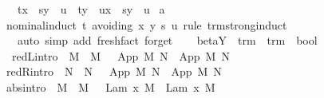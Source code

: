 \begin{isabellebody}
\ \ \ {\isachardoublequoteopen}t{\isacharbrackleft}x\ {\isacharcolon}{\isacharcolon}{\isacharequal}\ s{\isacharbrackright}{\isacharbrackleft}y\ {\isacharcolon}{\isacharcolon}{\isacharequal}\ u{\isacharbrackright}\ {\isacharequal}\ t{\isacharbrackleft}y\ {\isacharcolon}{\isacharcolon}{\isacharequal}\ u{\isacharbrackright}{\isacharbrackleft}x\ {\isacharcolon}{\isacharcolon}{\isacharequal}\ s{\isacharbrackleft}y\ {\isacharcolon}{\isacharcolon}{\isacharequal}\ u{\isacharbrackright}{\isacharbrackright}{\isachardoublequoteclose}\isanewline
%
\isadelimproof
%
\endisadelimproof
%
\isatagproof
{}\isamarkupfalse%
\ a\ \isanewline
{}\isamarkupfalse%
\ {\isacharparenleft}nominal{\isacharunderscore}induct\ t\ avoiding{\isacharcolon}\ x\ y\ s\ u\ rule{\isacharcolon}\ trm{\isachardot}strong{\isacharunderscore}induct{\isacharparenright}\isanewline
\ \ \ {\isacharparenleft}auto\ simp\ add{\isacharcolon}\ fresh{\isacharunderscore}fact\ forget{\isacharparenright}%
\endisatagproof
{\isafoldproof}%
%
\isadelimproof
%
\endisadelimproof
%
\isamarkuptrue%
\isamarkupfalse%
\ \isanewline
\ \ beta{\isacharunderscore}Y\ {\isacharcolon}{\isacharcolon}\ {\isachardoublequoteopen}trm\ {\isasymRightarrow}\ trm\ {\isasymRightarrow}\ bool{\isachardoublequoteclose}\ {\isacharparenleft}{\isachardoublequoteopen}\ {\isacharunderscore}\ {\isasymRightarrow}\ {\isacharunderscore}{\isachardoublequoteclose}\ {\isacharbrackleft}{}{}{\isacharcomma}{}{}{\isacharbrackright}\ {}{}{\isacharparenright}\isanewline
{}\isanewline
\ \ red{\isacharunderscore}L{\isacharbrackleft}intro{\isacharbrackright}{\isacharcolon}\ {\isachardoublequoteopen}{\isasymlbrakk}\ M\ {\isasymRightarrow}\ M{\isacharprime}\ {\isasymrbrakk}\ {\isasymLongrightarrow}\ App\ M\ N\ {\isasymRightarrow}\ App\ M{\isacharprime}\ N{\isachardoublequoteclose}\isanewline
{\isacharbar}\ red{\isacharunderscore}R{\isacharbrackleft}intro{\isacharbrackright}{\isacharcolon}\ {\isachardoublequoteopen}{\isasymlbrakk}\ N\ {\isasymRightarrow}\ N{\isacharprime}\ {\isasymrbrakk}\ {\isasymLongrightarrow}\ App\ M\ N\ {\isasymRightarrow}\ App\ M\ N{\isacharprime}{\isachardoublequoteclose}\isanewline
{\isacharbar}\ abs{\isacharbrackleft}intro{\isacharbrackright}{\isacharcolon}\ {\isachardoublequoteopen}{\isasymlbrakk}\ M\ {\isasymRightarrow}\ M{\isacharprime}\ {\isasymrbrakk}\ {\isasymLongrightarrow}\ Lam\ {\isacharbrackleft}x{\isacharbrackright}{\isachardot}\ M\ {\isasymRightarrow}\ Lam\ {\isacharbrackleft}x{\isacharbrackright}{\isachardot}\ M{\isacharprime}{\isachardoublequoteclose}\isanewline

\end{isabellebody}
